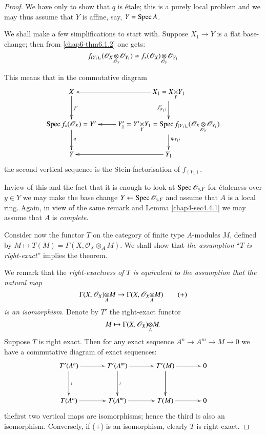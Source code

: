 \begin{proof}
We have only to show that $q$ is \'etale; this is a purely local
problem and we may thus assume that $Y$ is affine, say, $Y=\operatorname{Spec} A$.

We shall make a few simplifications to start with. Suppose $X_{1}\to
Y$ is a flat base-change; then from \ref{chap6-thm6.1.2} one gets:
$$
f_{(Y_{1})_{\ast}}(\foprod{\mathscr{O}_{X}}{\mathscr{O}_{Y_{1}}}{\mathscr{O}_{Y}})\simeq 
f_{\ast}\foprod{(\mathscr{O}_{X})}{\mathscr{O}_{Y_{1}}}{\mathscr{O}_{Y}} 
$$

This means that in the commutative diagram
\[
\xymatrix{
X\ar[d]^{f'} & X_{1}=\fprod{X}{Y_{1}}{Y}\ar[l]\ar[d]_{f'_{(Y_{1})}}\\
\Spec f_{\ast}(\mathscr{O}_{X})=Y'\ar[d]^{q} &
\ar[l]\ar[d]^{q_{(Y_{1})}} Y'_{1}=\fprod{Y'}{Y_{1}}{Y}=\Spec
f_{(Y_{1})_{\ast}}(\foprod{\mathscr{O}_{X}}{\mathscr{O}_{Y_{1}}}{\mathscr{O}_{Y}})\\ 
Y &\ar[l] Y_{1} 
}
\]
the second vertical sequence is the Stein-factorisation of $f_{(Y_{1})}$.

In\pageoriginale view of this and the fact that it is enough to look
at $\operatorname{Spec} \mathscr{O}_{y,Y}$ for \'etaleness over $y\in Y$ we may make
the base change $Y\leftarrow \operatorname{Spec} \mathscr{O}_{y,Y}$ and assume that
$A$ is a local ring. Again, in view of the same remark and Lemma
\ref{chap4-sec4.4.1} we may assume that $A$ is {\em complete}.

Consider now the functor $T$ on the category of finite type
$A$-modules $M$, defined by $M\mapsto
T(M)=\Gamma(X,\mathscr{O}_{X}\otimes_{A}M)$. We shall show that {\em
  the assumption} ``$T$ {\em is right-exact}'' implies the theorem.

We remark that the {\em right-exactness of $T$ is equivalent to the
  assumption that the natural map}
\begin{equation*}
\foprod{\Gamma(X,\mathscr{O}_{X})}{M}{A}\to
\Gamma(X,\foprod{\mathscr{O}_{X}}{M}{A}) \tag{+}
\end{equation*}
{\em is an isomorphism}. Denote by $T'$ the right-exact functor
$$
M\mapsto \foprod{\Gamma(X,\mathscr{O}_{X})}{M}{A}.
$$ 
Suppose $T$ is
right exact. Then for any exact sequence $A^{n}\to A^{m}\to M\to 0$ we
have a commutative diagram of exact sequences:
\[
\xymatrix@=1.2cm{
T'(A^{n})\ar[r]\ar[d]^{\wr} & T'(A^{m})\ar[r]\ar[d]^{\wr} &
T'(M)\ar[r]\ar[d] & 0\\
T(A^{n})\ar[r] & T(A^{m})\ar[r] & T(M)\ar[r] & 0
}
\]
the\pageoriginale first two vertical maps are isomorphisms; hence the
third is also an isomorphism. Conversely, if (+) is an isomorphism,
clearly $T$ is right-exact.


\end{proof}
